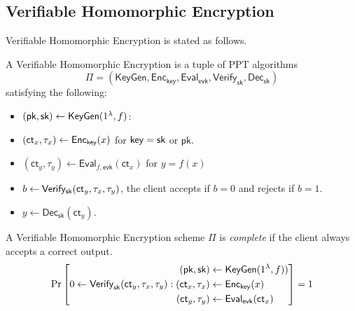 \documentclass[runningheads]{llncs}
\newcommand{\ct}{\textsf{ct}{}}
\newcommand{\sk}{\textsf{sk}{}}
\newcommand{\evk}{\textsf{evk}}
\newcommand{\pk}{\textsf{pk}{}}
\newcommand{\eval}{\textsf{Eval}}
\newcommand{\dec}{\textsf{Dec}}
\newcommand{\enc}{\textsf{Enc}}
\begin{document}
    \subsection{Verifiable Homomorphic Encryption}
    Verifiable Homomorphic Encryption is stated as follows. 
        \begin{definition}
            A Verifiable Homomorphic Encryption is a tuple of PPT algorithms 
            \[
            \Pi = (\mathsf{KeyGen, Enc_{key},Eval_{evk},Verify_{sk},Dec_{sk}})
            \]
            satisfying the following:
            \begin{itemize}
                \item $(\pk,\sk)\gets {\sf KeyGen}(1^\lambda,f)$: 
                \item $(\ct_x,\tau_x)\gets {\sf Enc_{key}}(x)$ for ${\sf key}=\sk$ or $\pk$.
                \item $(\ct_y,\tau_y)\gets\eval_{f,\evk}(\ct_x)$ for $y=f(x)$
                \item $b\gets {\sf Verify_\sk}(\ct_y,\tau_x,\tau_y)$, the client accepts if $b=0$ and rejects if $b=1$.
                \item $y\gets\dec_{\sk}(\ct_y).$
            \end{itemize}
        \end{definition}

        \begin{definition}[Completeness]\label{def:VHE_Completness}
            A Verifiable Homomorphic Encryption scheme $\Pi$ is \emph{complete} if the client always accepts a correct output. 
            \[
                \Pr\left[
                0\gets{\sf Verify}_{\sf sk}(\ct_y,\tau_x,\tau_y):                    
                \begin{aligned}
                        (\pk, \sk) &\gets \mathsf{KeyGen}(1^\lambda,f))\\
                        (\ct_x,\tau_x )&\gets \enc_{\mathsf{key}}(x)\\
                        (\ct_y,\tau_y )&\gets \eval_{\evk}(\ct_x)
                \end{aligned}
                \right]=1
            \]
        \end{definition}
        
\end{document}
